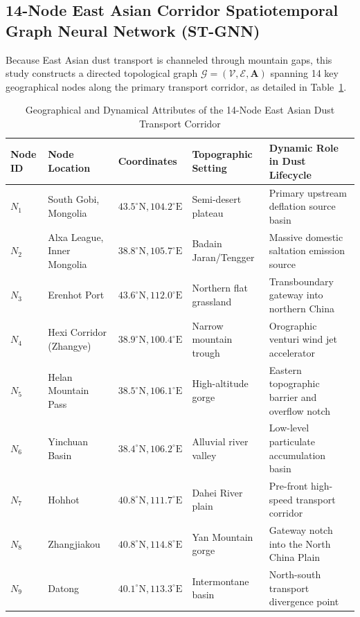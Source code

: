 \subsection{14-Node East Asian Corridor Spatiotemporal Graph Neural Network (ST-GNN)}
\label{subsec:st_gnn}

Because East Asian dust transport is channeled through mountain gaps, this study constructs a directed topological graph $\mathcal{G} = (\mathcal{V}, \mathcal{E}, \mathbf{A})$ spanning 14 key geographical nodes along the primary transport corridor, as detailed in Table~\ref{tab:corridor_nodes}.

\begin{table}[H]
\centering
\small
\caption{Geographical and Dynamical Attributes of the 14-Node East Asian Dust Transport Corridor}
\label{tab:corridor_nodes}
\begin{tabularx}{\textwidth}{l l l p{3.2cm} X}
\toprule
\textbf{Node ID} & \textbf{Node Location} & \textbf{Coordinates} & \textbf{Topographic Setting} & \textbf{Dynamic Role in Dust Lifecycle} \\
\midrule
$N_1$ & South Gobi, Mongolia & $43.5^\circ\text{N}, 104.2^\circ\text{E}$ & Semi-desert plateau & Primary upstream deflation source basin \\
$N_2$ & Alxa League, Inner Mongolia & $38.8^\circ\text{N}, 105.7^\circ\text{E}$ & Badain Jaran/Tengger & Massive domestic saltation emission source \\
$N_3$ & Erenhot Port & $43.6^\circ\text{N}, 112.0^\circ\text{E}$ & Northern flat grassland & Transboundary gateway into northern China \\
$N_4$ & Hexi Corridor (Zhangye) & $38.9^\circ\text{N}, 100.4^\circ\text{E}$ & Narrow mountain trough & Orographic venturi wind jet accelerator \\
$N_5$ & Helan Mountain Pass & $38.5^\circ\text{N}, 106.1^\circ\text{E}$ & High-altitude gorge & Eastern topographic barrier and overflow notch \\
$N_6$ & Yinchuan Basin & $38.4^\circ\text{N}, 106.2^\circ\text{E}$ & Alluvial river valley & Low-level particulate accumulation basin \\
$N_7$ & Hohhot & $40.8^\circ\text{N}, 111.7^\circ\text{E}$ & Dahei River plain & Pre-front high-speed transport corridor \\
$N_8$ & Zhangjiakou & $40.8^\circ\text{N}, 114.8^\circ\text{E}$ & Yan Mountain gorge & Gateway notch into the North China Plain \\
$N_9$ & Datong & $40.1^\circ\text{N}, 113.3^\circ\text{E}$ & Intermontane basin & North-south transport divergence point \\

\end{tabularx}
\end{table}
